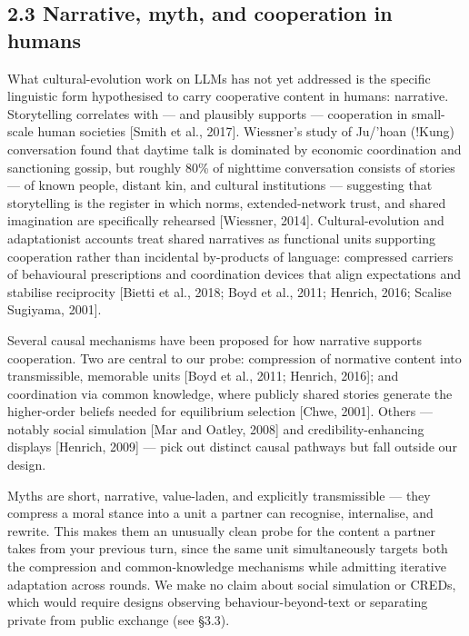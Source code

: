 \documentclass[
  10pt,
  letterpaper,
]{article}
\begin{document}
\subsection{2.3 Narrative, myth, and cooperation in
humans}\label{narrative-myth-and-cooperation-in-humans}

What cultural-evolution work on LLMs has not yet addressed is the
specific linguistic form hypothesised to carry cooperative content in
humans: narrative. Storytelling correlates with --- and plausibly
supports --- cooperation in small-scale human societies {[}Smith et al.,
2017{]}. Wiessner's study of Ju/'hoan (!Kung) conversation found that
daytime talk is dominated by economic coordination and sanctioning
gossip, but roughly 80\% of nighttime conversation consists of stories
--- of known people, distant kin, and cultural institutions ---
suggesting that storytelling is the register in which norms,
extended-network trust, and shared imagination are specifically
rehearsed {[}Wiessner, 2014{]}. Cultural-evolution and adaptationist
accounts treat shared narratives as functional units supporting
cooperation rather than incidental by-products of language: compressed
carriers of behavioural prescriptions and coordination devices that
align expectations and stabilise reciprocity {[}Bietti et al., 2018;
Boyd et al., 2011; Henrich, 2016; Scalise Sugiyama, 2001{]}.

Several causal mechanisms have been proposed for how narrative supports
cooperation. Two are central to our probe: compression of normative
content into transmissible, memorable units {[}Boyd et al., 2011;
Henrich, 2016{]}; and coordination via common knowledge, where publicly
shared stories generate the higher-order beliefs needed for equilibrium
selection {[}Chwe, 2001{]}. Others --- notably social simulation {[}Mar
and Oatley, 2008{]} and credibility-enhancing displays {[}Henrich,
2009{]} --- pick out distinct causal pathways but fall outside our
design.

Myths are short, narrative, value-laden, and explicitly transmissible
--- they compress a moral stance into a unit a partner can recognise,
internalise, and rewrite. This makes them an unusually clean probe for
the content a partner takes from your previous turn, since the same unit
simultaneously targets both the compression and common-knowledge
mechanisms while admitting iterative adaptation across rounds. We make
no claim about social simulation or CREDs, which would require designs
observing behaviour-beyond-text or separating private from public
exchange (see §3.3).
\end{document}
